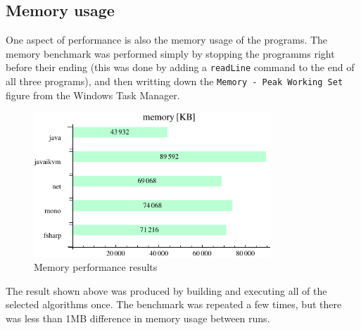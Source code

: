 \documentclass[journal]{IEEEtran/IEEEtran}
\newcommand\ver[1]{%
{\texttt{#1}}}
\newcommand\subsect[1]{\subsection{#1}\noindent}
\begin{document}
\subsect{Memory usage}
One aspect of performance is also the memory usage of the programs. The memory benchmark was performed simply by stopping the programms right before their ending (this was done by adding a \ver{readLine} command to the end of all three programs), and then writting down the \ver{Memory - Peak Working Set} figure from the Windows Task Manager.
\begin{figure}[H]
\centering
\includegraphics[width=3.5in]{res/mem}
\caption{Memory performance results}
\end{figure}
The result shown above was produced by building and executing all of the selected algorithms once. The benchmark was repeated a few times, but there was less than 1MB difference in memory usage between runs.


%
%
\end{document}
